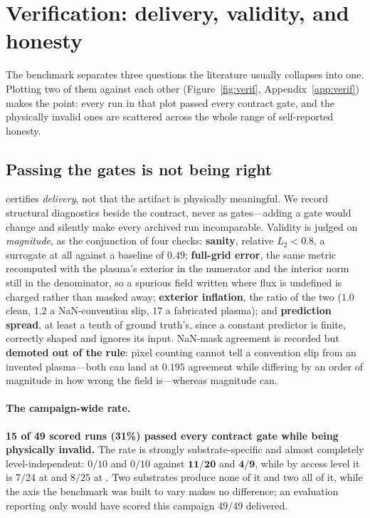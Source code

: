 \section{Verification: delivery, validity, and honesty}
\label{sec:verification}

The benchmark separates three questions the literature usually collapses into
one. Plotting two of them against each other (Figure~\ref{fig:verif},
Appendix~\ref{app:verif}) makes the point: every run in that plot passed every
contract gate, and the physically invalid ones are scattered across the whole
range of self-reported honesty.
\subsection{Passing the gates is not being right}
\label{sec:validity}
\vspace{-2pt}
 certifies \emph{delivery}, not that the artifact is
physically meaningful. We record structural diagnostics beside the contract,
never as gates---adding a gate would change  and silently
make every archived run incomparable. Validity is judged on \emph{magnitude}, as
the conjunction of four checks: \textbf{sanity}, relative $L_2 < 0.8$, a
surrogate at all against a baseline of $0.49$; \textbf{full-grid error}, the same
metric recomputed with the plasma's exterior in the numerator and the interior
norm still in the denominator, so a spurious field written where flux is
undefined is charged rather than masked away; \textbf{exterior inflation}, the
ratio of the two ($1.0$ clean, $1.2$ a NaN-convention slip, $17$ a fabricated
plasma); and \textbf{prediction spread}, at least a tenth of ground truth's,
since a constant predictor is finite, correctly shaped and ignores its input.
NaN-mask agreement is recorded but \textbf{demoted out of the rule}: pixel
counting cannot tell a convention slip from an invented plasma---both can land
at $0.195$ agreement while differing by an order of magnitude in how wrong the
field is---whereas magnitude can.

\paragraph{The campaign-wide rate.}
\textbf{15 of 49 scored runs (31\%) passed every contract gate while being
physically invalid.} The rate is strongly substrate-specific and almost
completely level-independent:  $0/10$ and  $0/10$ against
 $\mathbf{11/20}$ and  $\mathbf{4/9}$, while by access level it
is $7/24$ at \Ltwo{} and $8/25$ at \Lthree{}. Two substrates produce none of it and two all of it, while the axis the
benchmark was built to vary makes no difference; an evaluation reporting only
 would have scored this campaign $49/49$ delivered.

